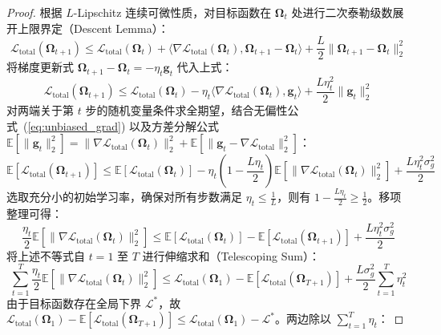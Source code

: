 \begin{proof}
根据 $L$-Lipschitz 连续可微性质，对目标函数在 $\bm{\Omega}_t$ 处进行二次泰勒级数展开上限界定（Descent Lemma）：
\begin{equation}
  \mathcal{L}_{\text{total}}(\bm{\Omega}_{t+1}) \le \mathcal{L}_{\text{total}}(\bm{\Omega}_t) + \langle \nabla \mathcal{L}_{\text{total}}(\bm{\Omega}_t), \bm{\Omega}_{t+1} - \bm{\Omega}_t \rangle + \frac{L}{2} \|\bm{\Omega}_{t+1} - \bm{\Omega}_t\|_2^2
\end{equation}
将梯度更新式 $\bm{\Omega}_{t+1} - \bm{\Omega}_t = -\eta_t \bm{g}_t$ 代入上式：
\begin{equation}
  \mathcal{L}_{\text{total}}(\bm{\Omega}_{t+1}) \le \mathcal{L}_{\text{total}}(\bm{\Omega}_t) - \eta_t \langle \nabla \mathcal{L}_{\text{total}}(\bm{\Omega}_t), \bm{g}_t \rangle + \frac{L \eta_t^2}{2} \|\bm{g}_t\|_2^2
  \label{eq:descent_step}
\end{equation}
对两端关于第 $t$ 步的随机变量条件求全期望，结合无偏性公式~(\ref{eq:unbiased_grad}) 以及方差分解公式 $\mathbb{E}[\|\bm{g}_t\|_2^2] = \|\nabla \mathcal{L}_{\text{total}}(\bm{\Omega}_t)\|_2^2 + \mathbb{E}[\|\bm{g}_t - \nabla \mathcal{L}_{\text{total}}\|_2^2]$：
\begin{equation}
  \mathbb{E}[\mathcal{L}_{\text{total}}(\bm{\Omega}_{t+1})] \le \mathbb{E}[\mathcal{L}_{\text{total}}(\bm{\Omega}_t)] - \eta_t \left( 1 - \frac{L \eta_t}{2} \right) \mathbb{E}[\|\nabla \mathcal{L}_{\text{total}}(\bm{\Omega}_t)\|_2^2] + \frac{L \eta_t^2 \sigma_g^2}{2}
\end{equation}
选取充分小的初始学习率，确保对所有步数满足 $\eta_t \le \frac{1}{L}$，则有 $1 - \frac{L \eta_t}{2} \ge \frac{1}{2}$。移项整理可得：
\begin{equation}
  \frac{\eta_t}{2} \mathbb{E}[\|\nabla \mathcal{L}_{\text{total}}(\bm{\Omega}_t)\|_2^2] \le \mathbb{E}[\mathcal{L}_{\text{total}}(\bm{\Omega}_t)] - \mathbb{E}[\mathcal{L}_{\text{total}}(\bm{\Omega}_{t+1})] + \frac{L \eta_t^2 \sigma_g^2}{2}
\end{equation}
将上述不等式自 $t=1$ 至 $T$ 进行伸缩求和（Telescoping Sum）：
\begin{equation}
  \sum_{t=1}^T \frac{\eta_t}{2} \mathbb{E}[\|\nabla \mathcal{L}_{\text{total}}(\bm{\Omega}_t)\|_2^2] \le \mathcal{L}_{\text{total}}(\bm{\Omega}_1) - \mathbb{E}[\mathcal{L}_{\text{total}}(\bm{\Omega}_{T+1})] + \frac{L \sigma_g^2}{2} \sum_{t=1}^T \eta_t^2
\end{equation}
由于目标函数存在全局下界 $\mathcal{L}^*$，故 $\mathcal{L}_{\text{total}}(\bm{\Omega}_1) - \mathbb{E}[\mathcal{L}_{\text{total}}(\bm{\Omega}_{T+1})] \le \mathcal{L}_{\text{total}}(\bm{\Omega}_1) - \mathcal{L}^*$。两边除以 $\sum_{t=1}^T \eta_t$：

\end{proof}

